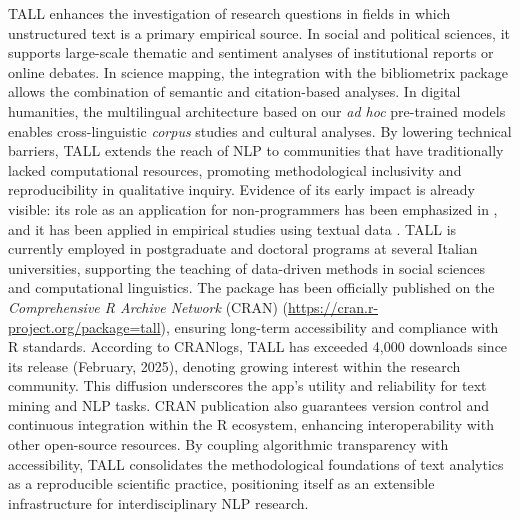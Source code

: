 \documentclass[preprint,12pt,a4paper]{elsarticle}
\begin{document}
TALL enhances the investigation of research questions in fields in which unstructured text is a primary empirical source. In social and political sciences, it supports large-scale thematic and sentiment analyses of institutional reports or online debates. In science mapping, the integration with the \textsf{bibliometrix} package allows the combination of semantic and citation-based analyses. In digital humanities, the multilingual architecture based on our \textit{ad hoc} pre-trained models enables cross-linguistic \textit{corpus} studies and cultural analyses. By lowering technical barriers, TALL extends the reach of NLP to communities that have traditionally lacked computational resources, promoting methodological inclusivity and reproducibility in qualitative inquiry. Evidence of its early impact is already visible: its role as an application for non-programmers has been emphasized in \cite{san24,tay25}, and it has been applied in empirical studies using textual data \cite{val25}. TALL is currently employed in postgraduate and doctoral programs at several Italian universities, supporting the teaching of data-driven methods in social sciences and computational linguistics. The package has been officially published on the \textit{Comprehensive R Archive Network} (CRAN) (\url{https://cran.r-project.org/package=tall}), ensuring long-term accessibility and compliance with \textsf{R} standards. According to CRANlogs, TALL has exceeded 4,000 downloads since its release (February, 2025), denoting growing interest within the research community. This diffusion underscores the app's utility and reliability for text mining and NLP tasks. CRAN publication also guarantees version control and continuous integration within the \textsf{R} ecosystem, enhancing interoperability with other open-source resources. By coupling algorithmic transparency with accessibility, TALL consolidates the methodological foundations of text analytics as a reproducible scientific practice, positioning itself as an extensible infrastructure for interdisciplinary NLP research. 
\end{document}
